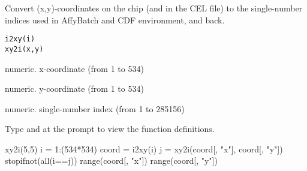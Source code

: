 \begin{Description}\relax
Convert (x,y)-coordinates on the chip (and in the CEL file) to the
single-number indices used in AffyBatch and CDF environment, and back.
\end{Description}
\begin{Usage}
\begin{verbatim}i2xy(i)
xy2i(x,y)
\end{verbatim}
\end{Usage}
\begin{Arguments}
\begin{ldescription}
\item[\code{x}] numeric. x-coordinate (from 1 to 534)
\item[\code{y}] numeric. y-coordinate (from 1 to 534)
\item[\code{i}] numeric. single-number index (from 1 to 285156)
\end{ldescription}
\end{Arguments}
\begin{Details}\relax
Type  and  at the \R{} prompt to 
view the function definitions.
\end{Details}
\begin{SeeAlso}\relax
{}
\end{SeeAlso}
\begin{Examples}
\begin{ExampleCode}
  xy2i(5,5)
  i     = 1:(534*534)
  coord = i2xy(i)
  j     = xy2i(coord[, "x"], coord[, "y"])
  stopifnot(all(i==j))
  range(coord[, "x"])
  range(coord[, "y"])
\end{ExampleCode}
\end{Examples}

